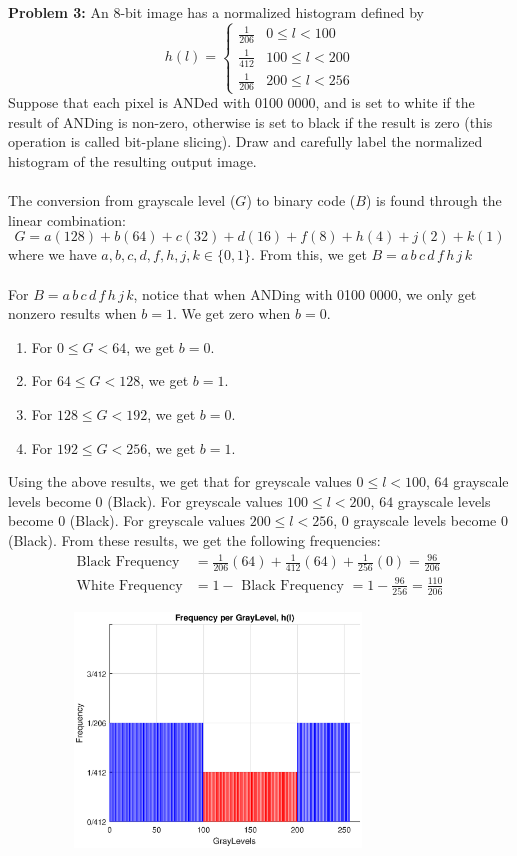 \documentclass[11pt]{article}
\newenvironment{problem}[1]{\textbf{Problem #1: }}{\newpage}
\begin{document}
	\begin{problem}{3}
		An 8-bit image has a normalized histogram defined by
		\[h(l) = \begin{cases}
			\frac{1}{206} & 0 \leq l  < 100 \\
			\frac{1}{412} & 100 \leq l  < 200 \\
			\frac{1}{206} & 200 \leq l  < 256
		\end{cases}\]
		Suppose that each pixel is ANDed with 0100 0000, and is set to white if the result of ANDing is non-zero, otherwise is set to black if the result is zero (this operation is called bit-plane slicing). Draw and carefully label the normalized histogram of the resulting output image.
		\\ \\
		The conversion from grayscale level ($G$) to binary code ($B$) is found through the linear combination:
		\[ G = a(128) + b(64) + c(32) + d(16) + f(8) + h(4) + j(2) + k(1)\]
		where we have $a,b,c,d,f,h,j,k \in \{0,1\}$. From this, we get $B = a\,b\,c\,d\,f\,h\,j\,k$
		\\ \\ 
		For $B = a\,b\,c\,d\,f\,h\,j\,k$, notice that when ANDing with 0100 0000, we only get nonzero results when $b = 1$.  We get zero when $b = 0$.
		\begin{enumerate}[label = (\alph*)]
			\item For $0 \leq G < 64$, we get $b = 0$. 
			\item For $64 \leq G < 128$, we get $b = 1$. 
			\item For $128 \leq G < 192$, we get $b = 0$.
			\item For $192 \leq G < 256$, we get $b = 1$. 
		\end{enumerate}  
		Using the above results, we get that for greyscale values $0 \leq l < 100$, $64$ grayscale levels become 0 (Black).  For greyscale values $100 \leq l < 200$, $64$ grayscale levels become 0 (Black).  For greyscale values $200 \leq l < 256$, $0$ grayscale levels become 0 (Black).  From these results, we get the following frequencies:
		\begin{align*} 
			\text{Black Frequency} &= \frac{1}{206}(64) + \frac{1}{412}(64) + \frac{1}{256}(0) = \frac{96}{206} \\
			\text{White Frequency} &= 1 - \text{ Black Frequency } = 1 - \frac{96}{256} = \frac{110}{206}
		\end{align*} 
		\begin{figure}[h!]
			\includegraphics[width = 9cm, height = 6.25cm]{Matlab/H3.eps}

\end{figure}
\end{problem}
\end{document}
